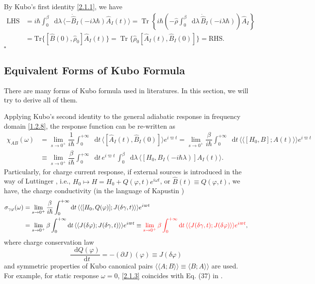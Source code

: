 \documentclass[10pt,nofootinbib,letterpaper]{revtex4}
\newcommand*\dd{\mathop{}\!\mathrm{d}}
\newenvironment{Proof}{{\par~{\normalfont\bfseries $\vartriangleright$}~~}}{\hfill $\square$\par\hfill\par} %
\begin{document}
		\begin{Proof}
			By Kubo's first identity \eqref{2.1.1}, we have
			\begin{align*}
				\text{LHS}&=i\hbar\int_0^\beta\dd\lambda\,\langle-\dot{\hat B}_I(-i\lambda\hbar)\hat A_I(t)\rangle=\mathop{\mathrm{Tr}}\left\{i\hbar\left(-\hat\rho\int_0^\beta\dd\lambda\,\dot{\hat B}_I(-i\lambda\hbar)\right)\hat A_I\right\}\\
				&=\mathrm{Tr}\{[\hat B(0),\hat\rho_0]\hat A_I(t)\}=\mathop{\mathrm{Tr}}\{\hat\rho_0[\hat A_I(t),\hat B_I(0)]\}=\text{RHS}.
			\end{align*}
		\end{Proof}

	\subsection{Equivalent Forms of Kubo Formula}
		There are many forms of Kubo formula used in literatures. In this section, we will try to derive all of them.\par
		Applying Kubo's second identity to the general adiabatic response in frequency domain \eqref{1.2.8}, the response function can be re-written as
		\begin{align}
			\chi_{AB}(\omega)&=\lim_{s \rightarrow0^+}\dfrac{1}{i\hbar}\int_0^{+\infty}\dd t\,\langle[\hat A_I(t),\hat B_I(0)]\rangle e^{i\varpi t}=\lim_{s \rightarrow0^+}\dfrac{\beta}{i\hbar}\int_0^{+\infty}\dd t\,\langle\langle[H_0, B]; A(t)\rangle\rangle e^{i\varpi t}\nonumber\\
			&\equiv\lim_{s \rightarrow0^+}\dfrac{\beta}{i\hbar}\int_0^{+\infty}\dd t\, e^{i\varpi t}\,\int_0^\beta\dd\lambda\,\langle[H_0,B_I(-i\hbar\lambda)]A_I(t)\rangle.\label{2.1.2}
		\end{align}
		\indent Particularly, for charge current response, if external sources is introduced in the way of Luttinger \cite{luttinger1964theory}, i.e., $H_0\mapsto H=H_0+Q(\varphi,t)e^{i\omega t}$, or $\hat B(t)\equiv Q(\varphi,t)$, we have, the charge conductivity (in the language of Kapustin \cite{kapustin2020thermal})
		\begin{align}
			\sigma_{\gamma\varphi}(\omega)&=\lim_{s \rightarrow0^+}\dfrac{\beta}{i\hbar}\int_0^{+\infty}\dd t\,\langle\langle[H_0, Q(\varphi)]; J(\delta\gamma,t)\rangle\rangle e^{i\varpi t}\nonumber\\
			&=\lim_{s \rightarrow0^+}\beta\int_0^{+\infty}\dd t\,\langle\langle J(\delta\varphi); J(\delta\gamma,t)\rangle\rangle e^{i\varpi t}\equiv{\color{red}\lim_{s \rightarrow0^+}\beta\int_0^{+\infty}\dd t\,\langle\langle J(\delta\gamma,t); J(\delta\varphi)\rangle\rangle e^{i\varpi t}},\label{2.1.3}
		\end{align}
		where charge conservation law
		\begin{equation}\label{2.1.4}
			\dfrac{\dd Q(\varphi)}{\dd t}=-(\partial J)(\varphi)\equiv J(\delta\varphi)
		\end{equation}
		and symmetric properties of Kubo canonical pairs $\langle\langle A;B\rangle\rangle\equiv\langle B;A\rangle\rangle$ are used. For example, for static response $\omega=0$, \eqref{2.1.3} coincides with {\color{blue}Eq. (37)} in \cite{kapustin2020thermal}.
\end{document}
